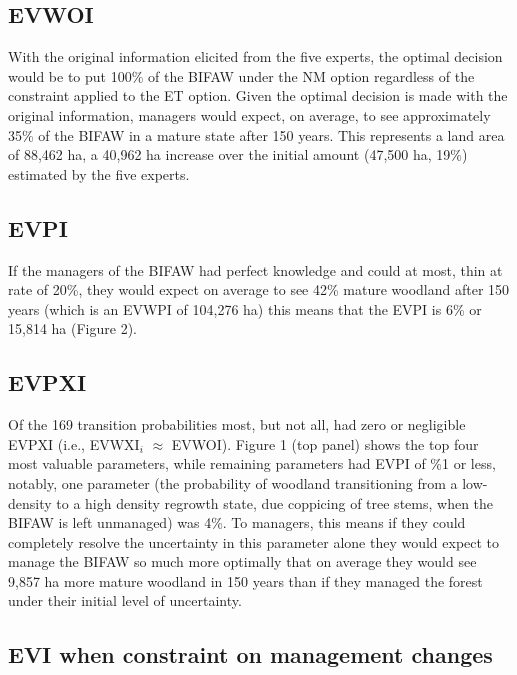 \documentclass[]{article}
\begin{document}
\subsection{EVWOI}\label{evwoi}

With the original information elicited from the five experts, the
optimal decision would be to put 100\% of the BIFAW under the NM option
regardless of the constraint applied to the ET option. Given the optimal
decision is made with the original information, managers would expect,
on average, to see approximately 35\% of the BIFAW in a mature state
after 150 years. This represents a land area of 88,462 ha, a 40,962 ha
increase over the initial amount (47,500 ha, 19\%) estimated by the five
experts.

\subsection{EVPI}\label{evpi-1}

If the managers of the BIFAW had perfect knowledge and could at most,
thin at rate of 20\%, they would expect on average to see 42\% mature
woodland after 150 years (which is an EVWPI of 104,276 ha) this means
that the EVPI is 6\% or 15,814 ha (Figure 2).

\subsection{EVPXI}\label{evpxi-1}

Of the 169 transition probabilities most, but not all, had zero or
negligible EVPXI (i.e., EVWXI\(_i\) \(\approx\) EVWOI). Figure 1 (top
panel) shows the top four most valuable parameters, while remaining
parameters had EVPI of \%1 or less, notably, one parameter (the
probability of woodland transitioning from a low-density to a high
density regrowth state, due coppicing of tree stems, when the BIFAW is
left unmanaged) was 4\%. To managers, this means if they could
completely resolve the uncertainty in this parameter alone they would
expect to manage the BIFAW so much more optimally that on average they
would see 9,857 ha more mature woodland in 150 years than if they
managed the forest under their initial level of uncertainty.

\subsection{EVI when constraint on management
changes}\label{evi-when-constraint-on-management-changes}
\end{document}
